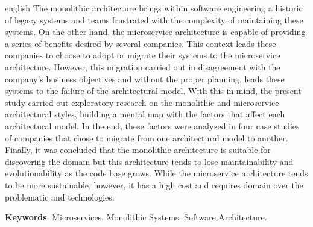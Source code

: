 \begin{resumo}[Abstract]
 \begin{otherlanguage*}{english}
    The monolithic architecture brings within software engineering a historic of
    legacy systems and teams frustrated with the complexity of maintaining these
    systems. On the other hand, the microservice architecture is capable of providing
    a series of benefits desired by several companies. This context leads these companies
    to choose to adopt or migrate their systems to the microservice architecture. However,
    this migration carried out in disagreement with the company's business objectives and
    without the proper planning, leads these systems to the failure of the architectural
    model. With this in mind, the present study carried out exploratory research on the
    monolithic and microservice architectural styles, building a mental map with the
    factors that affect each architectural model. In the end, these factors were analyzed
    in four case studies of companies that chose to migrate from one architectural model
    to another. Finally, it was concluded that the monolithic architecture is suitable for
    discovering the domain but this architecture tends to lose maintainability and
    evolutionability as the code base grows. While the microservice architecture tends to
    be more sustainable, however, it has a high cost and requires domain over the
    problematic and technologies.

   \vspace{\onelineskip}
 
   \noindent 
   \textbf{Keywords}: Microservices. Monolithic Systems. Software Architecture.
 \end{otherlanguage*}
\end{resumo}
